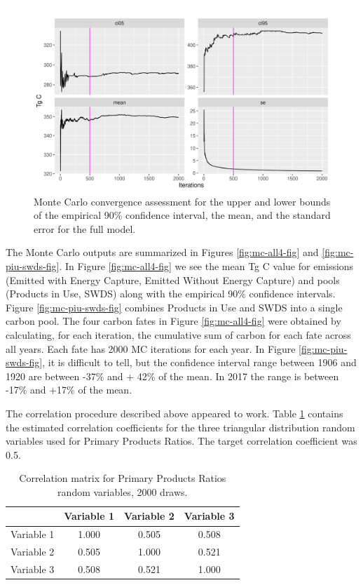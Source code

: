 \documentclass[
]{book}
\begin{document}
\begin{figure}
\includegraphics[width=1\linewidth]{images/MC_conv} \caption{Monte Carlo convergence assessment for the upper and lower bounds of the empirical 90\% confidence interval, the mean, and the standard error for the full model.}\label{fig:mc-conv-fig}
\end{figure}

The Monte Carlo outputs are summarized in Figures \ref{fig:mc-all4-fig} and \ref{fig:mc-piu-swds-fig}. In Figure \ref{fig:mc-all4-fig} we see the mean Tg C value for emissions (Emitted with Energy Capture, Emitted Without Energy Capture) and pools (Products in Use, SWDS) along with the empirical 90\% confidence intervals. Figure \ref{fig:mc-piu-swds-fig} combines Products in Use and SWDS into a single carbon pool. The four carbon fates in Figure \ref{fig:mc-all4-fig} were obtained by calculating, for each iteration, the cumulative sum of carbon for each fate across all years. Each fate has 2000 MC iterations for each year. In Figure \ref{fig:mc-piu-swds-fig}, it is difficult to tell, but the confidence interval range between 1906 and 1920 are between -37\% and + 42\% of the mean. In 2017 the range is between -17\% and +17\% of the mean.

The correlation procedure described above appeared to work. Table \ref{tab:ppr-cor-tab} contains the estimated correlation coefficients for the three triangular distribution random variables used for Primary Products Ratios. The target correlation coefficient was 0.5.

\begin{table}

\caption{\label{tab:ppr-cor-tab}Correlation matrix for Primary Products Ratios random variables, 2000 draws.}
\centering
\begin{tabular}[t]{lccc}
\toprule
  & Variable 1 & Variable 2 & Variable 3\\
\midrule
Variable 1 & 1.000 & 0.505 & 0.508\\
Variable 2 & 0.505 & 1.000 & 0.521\\
Variable 3 & 0.508 & 0.521 & 1.000\\
\bottomrule
\end{tabular}
\end{table}
\end{document}
